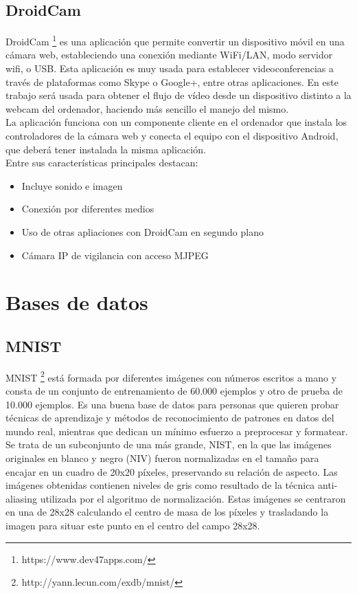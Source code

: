 \subsection{DroidCam}\label{sec.droid}
DroidCam \footnote{https://www.dev47apps.com/} es una aplicación que permite convertir un dispositivo móvil en una cámara web, estableciendo una conexión mediante WiFi/LAN, modo servidor wifi, o USB. Esta aplicación es muy usada para establecer videoconferencias a través de plataformas como Skype o Google+, entre otras aplicaciones. En este trabajo será usada para obtener el flujo de vídeo desde un dispositivo distinto a la webcam del ordenador, haciendo más sencillo el manejo del mismo.\\

La aplicación funciona con un componente cliente en el ordenador que instala los controladores de la cámara web y conecta el equipo con el dispositivo Android, que deberá tener instalada la misma aplicación.\\

Entre sus características principales destacan:
	\begin{itemize}
		\item Incluye sonido e imagen
		\item Conexión por diferentes medios
		\item Uso de otras apliaciones con DroidCam en segundo plano
		\item Cámara IP de vigilancia con acceso MJPEG
	\end{itemize}

 
\section{Bases de datos}
\subsection{MNIST}\label{sec.minst}
MNIST \footnote{http://yann.lecun.com/exdb/mnist/} está formada por diferentes imágenes con números escritos a mano y consta de un conjunto de entrenamiento de 60.000 ejemplos y otro de prueba de 10.000 ejemplos. Es una buena base de datos para personas que quieren probar técnicas de aprendizaje y métodos de reconocimiento de patrones en datos del mundo real, mientras que dedican un mínimo esfuerzo a preprocesar y formatear. \\

Se trata de un subconjunto de una más grande, NIST, en la que las imágenes originales en blanco y negro (NIV) fueron normalizadas en el tamaño para encajar en un cuadro de 20x20 píxeles, preservando su relación de aspecto. Las imágenes obtenidas contienen niveles de gris como resultado de la técnica anti-aliasing utilizada por el algoritmo de normalización. Estas imágenes se centraron en una de 28x28 calculando el centro de masa de los píxeles y trasladando la imagen para situar este punto en el centro del campo 28x28.\\

